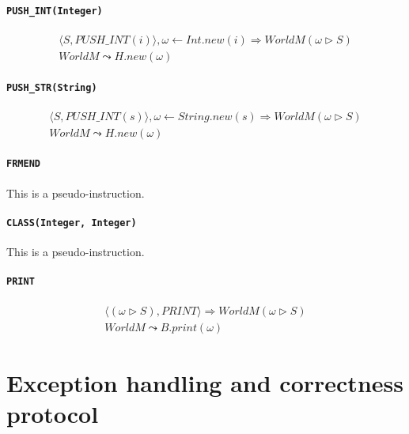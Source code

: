 \documentclass[]{article}
\numberwithin{equation}{section}
\numberwithin{figure}{section}
\numberwithin{table}{section}
\begin{document}
\paragraph{\texttt{PUSH\_INT(Integer)}}\label{pushux5fintinteger}

\begin{gather*}
  \langle S, PUSH\_INT(i)\rangle, \omega \leftarrow Int.new(i) \Rightarrow WorldM (\omega \rhd S)\\
  WorldM \leadsto H.new(\omega)
\end{gather*}

\paragraph{\texttt{PUSH\_STR(String)}}\label{pushux5fstrstring}

\begin{gather*}
  \langle S, PUSH\_INT(s)\rangle, \omega \leftarrow String.new(s) \Rightarrow WorldM (\omega \rhd S)\\
  WorldM \leadsto H.new(\omega)
\end{gather*}

\paragraph{\texttt{FRMEND}}\label{frmend}

This is a pseudo-instruction.

\paragraph{\texttt{CLASS(Integer, Integer)}}\label{classinteger-integer}

This is a pseudo-instruction.

\paragraph{\texttt{PRINT}}\label{print}

\begin{gather*}
  \langle (\omega \rhd S), PRINT\rangle \Rightarrow WorldM (\omega \rhd S) \\
  WorldM \leadsto B.print(\omega)
\end{gather*}

\section{Exception handling and correctness
protocol}\label{exception-handling-and-correctness-protocol}
\end{document}
